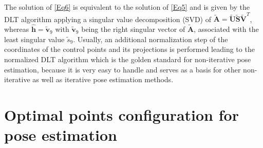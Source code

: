 \documentclass[letterpaper, 10 pt, conference]{ieeeconf}  %
\begin{document}
	The solution of \eqref{Eq6} is equivalent to the solution of \eqref{Eq5} 
	and is given by the DLT algorithm applying a singular value decomposition (SVD) of 
	$\tilde{\mathbf{A}} = \tilde{\mathbf{U}}\tilde{\mathbf{S}}\tilde{\mathbf{V}}^T$,
	whereas $\hat{\mathbf{h}}=\tilde{\mathbf{v}}_9$ with $\tilde{\mathbf{v}}_9$ being the 
	right singular vector of $\tilde{\mathbf{A}}$, associated with the least singular value $\tilde{s}_9$. Usually, an additional normalization step of the coordinates of the control points
	and its projections is performed leading to the normalized DLT algorithm which is the golden standard for non-iterative pose estimation, because it is very easy to handle and serves as a basis for other non-iterative as well as iterative pose estimation methods.
	
	\section{Optimal points configuration for pose estimation}
	\label{IdeaPointConfigSearch}
	
\end{document}
